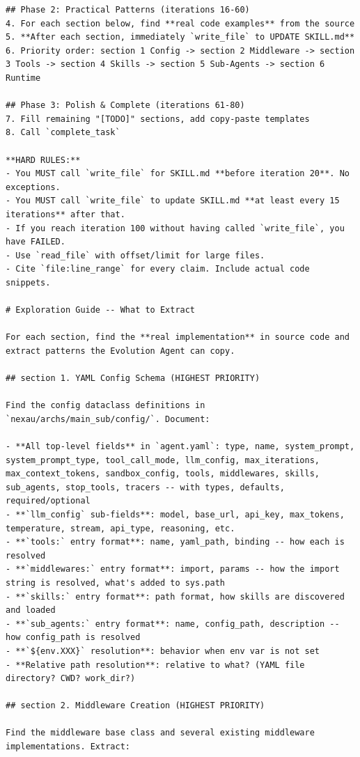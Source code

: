 \begin{tcolorbox}
\begin{lstlisting}
## Phase 2: Practical Patterns (iterations 16-60)
4. For each section below, find **real code examples** from the source
5. **After each section, immediately `write_file` to UPDATE SKILL.md**
6. Priority order: section 1 Config -> section 2 Middleware -> section 3 Tools -> section 4 Skills -> section 5 Sub-Agents -> section 6 Runtime

## Phase 3: Polish & Complete (iterations 61-80)
7. Fill remaining "[TODO]" sections, add copy-paste templates
8. Call `complete_task`

**HARD RULES:**
- You MUST call `write_file` for SKILL.md **before iteration 20**. No exceptions.
- You MUST call `write_file` to update SKILL.md **at least every 15 iterations** after that.
- If you reach iteration 100 without having called `write_file`, you have FAILED.
- Use `read_file` with offset/limit for large files.
- Cite `file:line_range` for every claim. Include actual code snippets.

# Exploration Guide -- What to Extract

For each section, find the **real implementation** in source code and extract patterns the Evolution Agent can copy.

## section 1. YAML Config Schema (HIGHEST PRIORITY)

Find the config dataclass definitions in `nexau/archs/main_sub/config/`. Document:

- **All top-level fields** in `agent.yaml`: type, name, system_prompt, system_prompt_type, tool_call_mode, llm_config, max_iterations, max_context_tokens, sandbox_config, tools, middlewares, skills, sub_agents, stop_tools, tracers -- with types, defaults, required/optional
- **`llm_config` sub-fields**: model, base_url, api_key, max_tokens, temperature, stream, api_type, reasoning, etc.
- **`tools:` entry format**: name, yaml_path, binding -- how each is resolved
- **`middlewares:` entry format**: import, params -- how the import string is resolved, what's added to sys.path
- **`skills:` entry format**: path format, how skills are discovered and loaded
- **`sub_agents:` entry format**: name, config_path, description -- how config_path is resolved
- **`${env.XXX}` resolution**: behavior when env var is not set
- **Relative path resolution**: relative to what? (YAML file directory? CWD? work_dir?)

## section 2. Middleware Creation (HIGHEST PRIORITY)

Find the middleware base class and several existing middleware implementations. Extract:


\end{lstlisting}
\end{tcolorbox}
